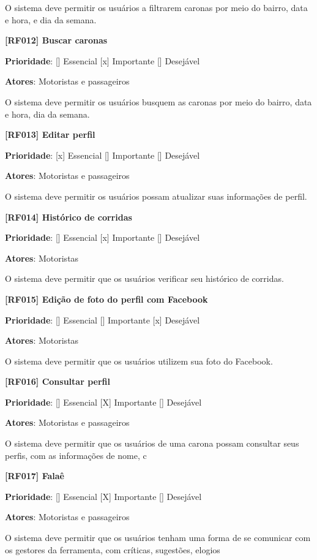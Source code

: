 O sistema deve permitir os usuários a filtrarem caronas por meio do bairro, data e hora, e dia da semana.

\textbf{[RF012] Buscar caronas}

\textbf{Prioridade}:      [] Essencial        [x] Importante     [] Desejável 

\textbf{Atores}: Motoristas e passageiros

O sistema deve permitir os usuários busquem as caronas por meio do bairro, data e hora, dia da semana.

\textbf{[RF013] Editar perfil}

\textbf{Prioridade}:      [x] Essencial        [] Importante     [] Desejável 

\textbf{Atores}: Motoristas e passageiros

O sistema deve permitir os usuários possam atualizar suas informações de perfil.

\textbf{[RF014] Histórico de corridas}

\textbf{Prioridade}:      [] Essencial        [x] Importante     [] Desejável 

\textbf{Atores}: Motoristas

O sistema deve permitir que os usuários verificar seu histórico de corridas.

\textbf{[RF015] Edição de foto do perfil com Facebook}

\textbf{Prioridade}:      [] Essencial        [] Importante     [x] Desejável 

\textbf{Atores}: Motoristas

O sistema deve permitir que os usuários utilizem sua foto do Facebook.


\textbf{[RF016] Consultar perfil}

\textbf{Prioridade}:      [] Essencial        [X] Importante     [] Desejável 

\textbf{Atores}: Motoristas e passageiros

O sistema deve permitir que os usuários de uma carona possam consultar seus perfis, com as informações de nome, c


\textbf{[RF017] Falaê}

\textbf{Prioridade}:      [] Essencial        [X] Importante     [] Desejável 

\textbf{Atores}: Motoristas e passageiros

O sistema deve permitir que os usuários tenham uma forma de se comunicar com os gestores da ferramenta, com críticas, sugestões, elogios

